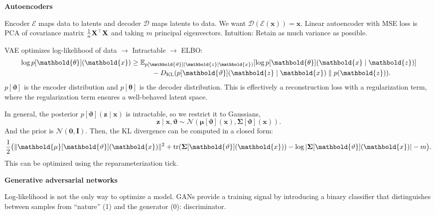 \documentclass[10pt]{article}
\newenvironment{topic}[1]
{\textbf{\sffamily \footnotesize \colorbox{black}{\rlap{\textbf{\textcolor{white}{#1}}}\hspace{\linewidth}\hspace{-2\fboxsep}}}}
{}
\newenvironment{subtopic}[1]
{\begin{center}\textbf{\footnotesize \sffamily #1}\end{center}}
{}
\renewcommand{\det}[1]{|#1|}
\renewcommand{\mat}[1]{\ensuremath{\mathbf{#1}}}
\renewcommand{\vec}[1]{\ensuremath{\mathbold{#1}}}
\begin{document}
\begin{multicols*}{3}
\begin{topic}{Statistical learning theory}
    \end{topic}

    \begin{topic}{Generative models}

        \begin{subtopic}{Autoencoders}
            Encoder $\bm{\mathcal{E}}$ maps data to latents and decoder $\bm{\mathcal{D}}$ maps
            latents to data. We want $\bm{\mathcal{D}}(\bm{\mathcal{E}}(\vec{x})) = \vec{x}$. Linear
            autoencoder with MSE loss is PCA of covariance matrix $\frac{1}{n} \transpose{\mat{X}}
                \mat{X}$ and taking $m$ principal eigenvectors. Intuition: Retain as much variance as possible.

            VAE optimizes log-likelihood of data $\to$ Intractable $\to$ ELBO:
            \begin{align*}
                \log p[\vec{\theta}](\vec{x}) & \geq \E_{p[\vec{\vartheta}](\vec{z} \mid \vec{x})} [\log p[\vec{\theta}](\vec{x} \mid \vec{z})] \\
                                              & \quad \quad \quad - D_{\mathrm{KL}}(p[\vec{\vartheta}](\vec{z} \mid \vec{x}) \;\|\; p(\vec{z})).
            \end{align*}
            $p[\vec{\vartheta}]$ is the encoder distribution and $p[\vec{\theta}]$ is the decoder
            distribution. This is effectively a reconstruction loss with a regularization term, where
            the regularization term ensures a well-behaved latent space.

            In general, the posterior $p[\vec{\vartheta}](\vec{z} \mid \vec{x})$ is intractable, so we restrict
            it to Gaussians, \[
                \vec{z} \mid \vec{x}, \vec{\vartheta} \sim \mathcal{N}(\vec{\mu}[\vec{\vartheta}](\vec{x}), \mat{\Sigma}[\vec{\vartheta}](\vec{x})).
            \]
            And the prior is $\mathcal{N}(\vec{0}, \mat{I})$. Then, the KL divergence can be computed in a
            closed form: \[
                \frac{1}{2} \lft( \| \vec{\mu}[\vec{\vartheta}](\vec{x}) \|^2 + \tr{\mat{\Sigma}[\vec{\vartheta}](\vec{x})} - \log \det{\mat{\Sigma}[\vec{\vartheta}](\vec{x})} - m \rgt).
            \]
            This can be optimized using the reparameterization tick.
        \end{subtopic}

        \begin{subtopic}{Generative adversarial networks}
            Log-likelihood is not the only way to optimize a model. GANs provide a training signal by
            introducing a binary classifier that distinguishes between samples from ``nature'' (1) and the
            generator (0): discriminator.


\end{subtopic}
\end{topic}
\end{multicols*}
\end{document}
